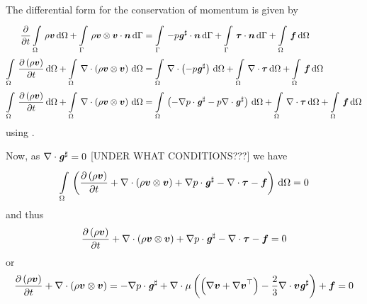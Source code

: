 The differential form for the conservation of momentum is given by
\begin{equation}
  \begin{split}
    \delby{}{t}\gint{\Omega}{}{\rho\vectr{v}}{\Omega}+
    \gint{\Gamma}{}{\dotprod{\tensorprod{\rho\vectr{v}}{\vectr{v}}}{\vectr{n}}}{\Gamma}
    &=\gint{\Gamma}{}{\dotprod{-p\sharptensor{\tensor{g}}}{\vectr{n}}}{\Gamma}
    +\gint{\Gamma}{}{\dotprod{\tensor{\tau}}{\vectr{n}}}{\Gamma}
    +\gint{\Omega}{}{\vectr{f}}{\Omega} \\
    \gint{\Omega}{}{\delby{\pbrac{\rho\vectr{v}}}{t}}{\Omega}
    +\gint{\Omega}{}{\divergence{}{\pbrac{\tensorprod{\rho\vectr{v}}{\vectr{v}}}}}{\Omega}
    &=\gint{\Omega}{}{\divergence{}{\pbrac{-p\sharptensor{\tensor{g}}}}}{\Omega}
    +\gint{\Omega}{}{\divergence{}{\tensor{\tau}}}{\Omega}
    +\gint{\Omega}{}{\vectr{f}}{\Omega}\\
    \gint{\Omega}{}{\delby{\pbrac{\rho\vectr{v}}}{t}}{\Omega}
    +\gint{\Omega}{}{\divergence{}{\pbrac{\tensorprod{\rho\vectr{v}}{\vectr{v}}}}}{\Omega}
    &=\gint{\Omega}{}{\pbrac{-\dotprod{\gradient{}{p}}{\sharptensor{\tensor{g}}}-p\divergence{}{\sharptensor{\tensor{g}}}}}{\Omega}+\gint{\Omega}{}{\divergence{}{\tensor{\tau}}}{\Omega}
    +\gint{\Omega}{}{\vectr{f}}{\Omega}\\
  \end{split}
\end{equation}
using .

Now, as $\divergence{}{\sharptensor{\tensor{g}}}=0$ [UNDER WHAT CONDITIONS???]
we have
\begin{equation}
  \gint{\Omega}{}{\pbrac{\delby{\pbrac{\rho\vectr{v}}}{t}
      +\divergence{}{\pbrac{\tensorprod{\rho\vectr{v}}{\vectr{v}}}}
      +\dotprod{\gradient{}{p}}{\sharptensor{\tensor{g}}}-\divergence{}{\tensor{\tau}}-\vectr{f}}}{\Omega}=0
\end{equation}
and thus
\begin{equation}
  \delby{\pbrac{\rho\vectr{v}}}{t}+\divergence{}{\pbrac{\tensorprod{\rho\vectr{v}}{\vectr{v}}}}
  +\dotprod{\gradient{}{p}}{\sharptensor{\tensor{g}}}-\divergence{}{\tensor{\tau}}-\vectr{f}=0
\end{equation}
or
\begin{equation}
  \delby{\pbrac{\rho\vectr{v}}}{t}+\divergence{}{\pbrac{\tensorprod{\rho\vectr{v}}{\vectr{v}}}}
  =-\dotprod{\gradient{}{p}}{\sharptensor{\tensor{g}}}+\divergence{}{\mu\pbrac{\pbrac{\gradient{}{\vectr{v}}
        +\transpose{\gradient{}{\vectr{v}}}}-\frac{2}{3}\divergence{}{\vectr{v}}
      \sharptensor{\tensor{g}}}}+\vectr{f}=0
  \label{eqn:differentialconservationofmomentum}
\end{equation}

